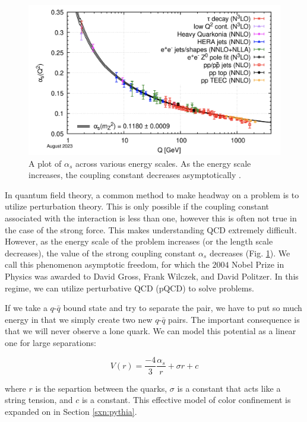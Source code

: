 \documentclass[../main.tex]{subfiles}
\begin{document}
\begin{figure}[h]
    \centering
    \includegraphics[scale=0.2]{introduction/figs/asymptotic.png}
    \caption{A plot of $\alpha_s$ across various energy scales. As the energy scale increases, the coupling constant decreases asymptotically \cite{Workman:2022ynf}.}
    \label{fig:asymptotic}
\end{figure}

In quantum field theory, a common method to make headway on a problem is to utilize perturbation theory. This is only possible if the coupling constant associated with the interaction is less than one, however this is often not true in the case of the strong force. This makes understanding QCD extremely difficult. However, as the energy scale of the problem increases (or the length scale decreases), the value of the strong coupling constant $\alpha_s$ decreases (Fig. \ref{fig:asymptotic}). We call this phenomenon asymptotic freedom, for which the $2004$ Nobel Prize in Physics was awarded to David Gross, Frank Wilczek, and David Politzer. In this regime, we can utilize perturbative QCD (pQCD) to solve problems. 

If we take a $q$-$\bar{q}$ bound state and try to separate the pair, we have to put so much energy in that we simply create two new $q$-$\bar{q}$ pairs. The important consequence is that we will never observe a lone quark. We can model this potential as a linear one for large separations:

\begin{equation} 
    \label{eq:cornell}
    V(r) = \frac{-4}{3}\frac{\alpha_s}{r} + \sigma r + c 
\end{equation}

where $r$ is the separtion between the quarks, $\sigma$ is a constant that acts like a string tension, and $c$ is a constant. This effective model of color confinement is expanded on in Section \ref{sxn:pythia}. 
\end{document}
